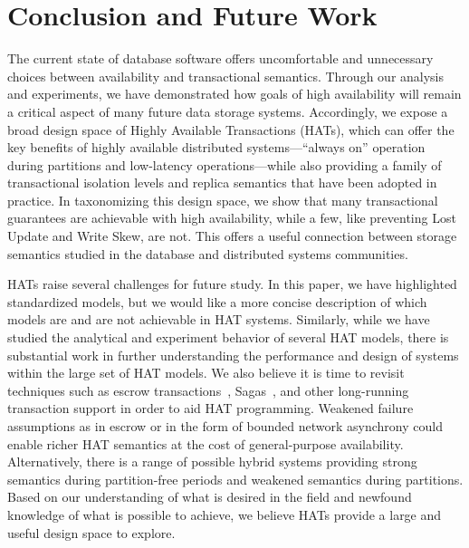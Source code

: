
\section{Conclusion and Future Work}
The current state of database software offers uncomfortable and
unnecessary choices between availability and transactional semantics.
Through our analysis and experiments, we have demonstrated how goals
of high availability will remain a critical aspect of many future data
storage systems. Accordingly, we expose a broad design space of Highly
Available Transactions (HATs), which can offer the key benefits of
highly available distributed systems---``always on'' operation during
partitions and low-latency operations---while also providing a family
of transactional isolation levels and replica semantics that have been
adopted in practice.  In taxonomizing this design space, we show that
many transactional guarantees are achievable with high availability,
while a few, like preventing Lost Update and Write Skew, are not. This
offers a useful connection between storage semantics studied in the
database and distributed systems communities.

HATs raise several challenges for future study. In this paper, we have
highlighted standardized models, but we would like a more concise
description of which models are and are not achievable in HAT
systems. Similarly, while we have studied the analytical and
experiment behavior of several HAT models, there is substantial work
in further understanding the performance and design of systems within
the large set of HAT models. We also believe it is time to revisit
techniques such as escrow transactions~\cite{escrow},
Sagas~\cite{sagas}, and other long-running transaction support in
order to aid HAT programming. Weakened failure assumptions as in
escrow or in the form of bounded network asynchrony could enable
richer HAT semantics at the cost of general-purpose
availability. Alternatively, there is a range of possible hybrid
systems providing strong semantics during partition-free periods and
weakened semantics during partitions. Based on our understanding of
what is desired in the field and newfound knowledge of what is
possible to achieve, we believe HATs provide a large and useful design
space to explore.



